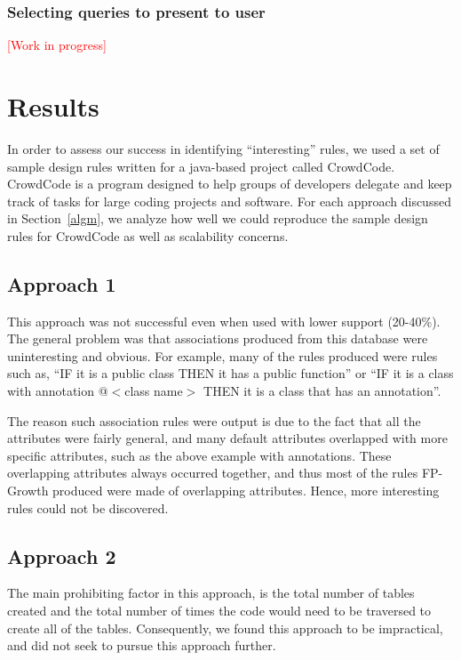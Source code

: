 \documentclass[12pt]{article}
\newcommand{\tcr}{\textcolor{red}}
\begin{document}
\subsubsection{Selecting queries to present to user}

\tcr{[Work in progress]}

\clearpage

\section{Results} \label{results}
In order to assess our success in identifying “interesting” rules, we used a set of sample design rules written for a java-based project called CrowdCode. CrowdCode is a program designed to help groups of developers delegate and keep track of tasks for large coding projects and software. For each approach discussed in Section~\ref{algm}, we analyze how well we could reproduce the sample design rules for CrowdCode as well as scalability concerns.

	\subsection{Approach 1}
	This approach was not successful even when used with lower support (20-40\%). The general problem was that associations produced from this database were uninteresting and obvious. For example, many of the rules produced were rules such as, “IF it is a public class THEN it has a public function” or “IF it is a class with annotation @$<$class name$>$ THEN it is a class that has an annotation”. 

The reason such association rules were output is due to the fact that all the attributes were fairly general, and many default attributes overlapped with more specific attributes, such as the above example with annotations. These overlapping attributes always occurred together, and thus most of the rules FP-Growth produced were made of overlapping attributes. Hence, more interesting rules could not be discovered.

	\subsection{Approach 2}
	The main prohibiting factor in this approach, is the total number of tables created and the total number of times the code would need to be traversed to create all of the tables. Consequently, we found this approach to be impractical, and did not seek to pursue this approach further.
\end{document}
